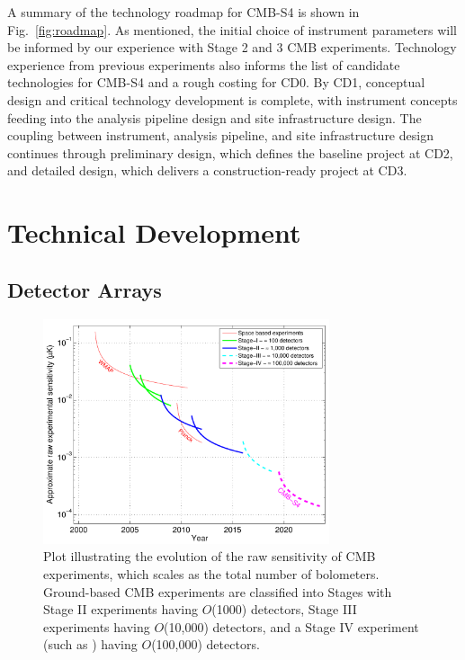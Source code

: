 A summary of the technology roadmap for CMB-S4 is shown in Fig.~\ref{fig:roadmap}.  As mentioned, the initial choice of instrument parameters will be informed by our experience with Stage 2 and 3 CMB experiments. Technology experience from previous experiments also informs the list of candidate technologies for CMB-S4 and a rough costing for CD0. By CD1, conceptual design and critical technology development is complete, with instrument concepts feeding into the analysis pipeline design and site infrastructure design. The coupling between instrument, analysis pipeline, and site infrastructure design continues through preliminary design, which defines the baseline project at CD2, and detailed design, which delivers a construction-ready project at CD3.

\section{Technical Development}

\subsection{Detector Arrays}
\label{sec:detectors}

\begin{figure}[t]
\centering \includegraphics[width=0.75\textwidth]{Intro/expt_progress.pdf}
\caption{Plot illustrating the evolution of the raw sensitivity of CMB
  experiments, which scales as the total number of
  bolometers. Ground-based CMB experiments are classified into Stages
  with Stage II experiments having $O$(1000) detectors, Stage III
  experiments having $O$(10,000) detectors, and a Stage IV experiment
  (such as \cmbexp) having $O$(100,000) detectors.}
\label{fig:expt_progress}
\end{figure}

